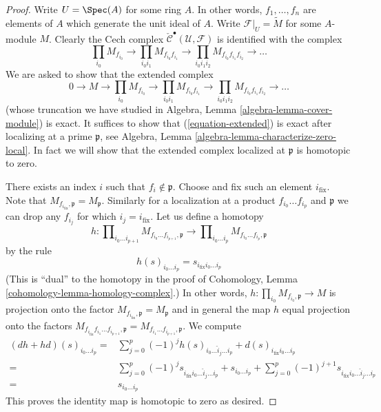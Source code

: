 \begin{proof}
Write $U = \Spec(A)$ for some ring $A$.
In other words, $f_1, \ldots, f_n$ are elements of $A$
which generate the unit ideal of $A$.
Write $\mathcal{F}|_U = \widetilde{M}$ for some $A$-module $M$.
Clearly the Cech complex
$\check{\mathcal{C}}^\bullet(\mathcal{U}, \mathcal{F})$
is identified with the complex
$$
\prod_{i_0} M_{f_{i_0}} \to
\prod_{i_0i_1} M_{f_{i_0}f_{i_1}} \to
\prod_{i_0i_1i_2} M_{f_{i_0}f_{i_1}f_{i_2}} \to
\ldots
$$
We are asked to show that the extended complex
\begin{equation}
\label{equation-extended}
0 \to
M \to
\prod_{i_0} M_{f_{i_0}} \to
\prod_{i_0i_1} M_{f_{i_0}f_{i_1}} \to
\prod_{i_0i_1i_2} M_{f_{i_0}f_{i_1}f_{i_2}} \to
\ldots
\end{equation}
(whose truncation we have studied in
Algebra, Lemma \ref{algebra-lemma-cover-module}) is exact.
It suffices to show that (\ref{equation-extended})
is exact after localizing at a prime $\mathfrak p$, see
Algebra, Lemma \ref{algebra-lemma-characterize-zero-local}.
In fact we will show that the extended complex localized
at $\mathfrak p$ is homotopic to zero.

\medskip\noindent
There exists an index $i$ such that $f_i \not \in \mathfrak p$.
Choose and fix such an element $i_{\text{fix}}$. Note that
$M_{f_{i_{\text{fix}}}, \mathfrak p} = M_{\mathfrak p}$. Similarly
for a localization at a product $f_{i_0} \ldots f_{i_p}$ and $\mathfrak p$
we can drop any $f_{i_j}$ for which $i_j = i_{\text{fix}}$.
Let us define a homotopy
$$
h :
\prod\nolimits_{i_0 \ldots i_{p + 1}}
M_{f_{i_0} \ldots f_{i_{p + 1}}, \mathfrak p}
\longrightarrow
\prod\nolimits_{i_0 \ldots i_p}
M_{f_{i_0} \ldots f_{i_p}, \mathfrak p}
$$
by the rule
$$
h(s)_{i_0 \ldots i_p} = s_{i_{\text{fix}} i_0 \ldots i_p}
$$
(This is ``dual'' to the homotopy in the proof of
Cohomology, Lemma \ref{cohomology-lemma-homology-complex}.)
In other words, $h : \prod_{i_0} M_{f_{i_0}, \mathfrak p} \to M$
is projection onto the factor
$M_{f_{i_{\text{fix}}}, \mathfrak p} = M_{\mathfrak p}$ and in general
the map $h$ equal projection onto the factors
$M_{f_{i_{\text{fix}}} f_{i_1} \ldots f_{i_{p + 1}}, \mathfrak p}
= M_{f_{i_1} \ldots f_{i_{p + 1}}, \mathfrak p}$. We compute
\begin{align*}
(dh + hd)(s)_{i_0 \ldots i_p}
= &
\sum_{j = 0}^p
(-1)^j
h(s)_{i_0 \ldots \hat i_j \ldots i_p}
+
d(s)_{i_{\text{fix}} i_0 \ldots i_p}\\
= &
\sum_{j = 0}^p
(-1)^j
s_{i_{\text{fix}} i_0 \ldots \hat i_j \ldots i_p}
+
s_{i_0 \ldots i_p}
+
\sum_{j = 0}^p
(-1)^{j + 1}
s_{i_{\text{fix}} i_0 \ldots \hat i_j \ldots i_p} \\
= &
s_{i_0 \ldots i_p}
\end{align*}
This proves the identity map is homotopic to zero as desired.
\end{proof}

